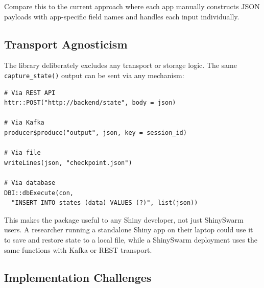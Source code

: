 \documentclass[11pt,a4paper]{article}
\begin{document}
Compare this to the current approach where each app manually constructs JSON
payloads with app-specific field names and handles each input individually.

\subsection{Transport Agnosticism}

The library deliberately excludes any transport or storage logic. The same
\texttt{capture\_state()} output can be sent via any mechanism:

\begin{verbatim}
# Via REST API
httr::POST("http://backend/state", body = json)

# Via Kafka
producer$produce("output", json, key = session_id)

# Via file
writeLines(json, "checkpoint.json")

# Via database
DBI::dbExecute(con,
  "INSERT INTO states (data) VALUES (?)", list(json))
\end{verbatim}

This makes the package useful to any Shiny developer, not just ShinySwarm users.
A researcher running a standalone Shiny app on their laptop could use it to save
and restore state to a local file, while a ShinySwarm deployment uses the same
functions with Kafka or REST transport.

\subsection{Implementation Challenges}
\end{document}
